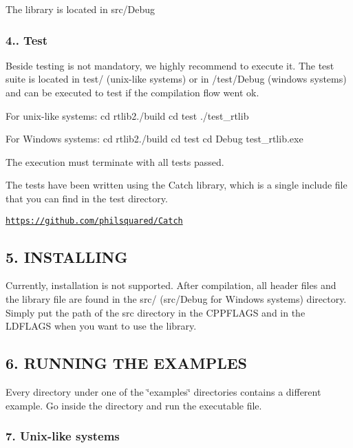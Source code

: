 The library is located in src/\+Debug

\subsubsection*{4.. Test}

Beside testing is not mandatory, we highly recommend to execute it. The test suite is located in test/ (unix-\/like systems) or in /test/\+Debug (windows systems) and can be executed to test if the compilation flow went ok.


\begin{DoxyItemize}
\item For unix-\/like systems\+: cd rtlib2./build cd test ./test\+\_\+rtlib
\item For Windows systems\+: cd rtlib2./build cd test cd Debug test\+\_\+rtlib.\+exe
\end{DoxyItemize}

The execution must terminate with all tests passed.

The tests have been written using the Catch library, which is a single include file that you can find in the test directory.

\href{https://github.com/philsquared/Catch}{\tt https\+://github.\+com/philsquared/\+Catch}

\subsection*{5. I\+N\+S\+T\+A\+L\+L\+I\+NG}

Currently, installation is not supported. After compilation, all header files and the library file are found in the src/ (src/\+Debug for Windows systems) directory. Simply put the path of the src directory in the C\+P\+P\+F\+L\+A\+GS and in the L\+D\+F\+L\+A\+GS when you want to use the library.

\subsection*{6. R\+U\+N\+N\+I\+NG T\+HE E\+X\+A\+M\+P\+L\+ES}

Every directory under one of the \char`\"{}examples\char`\"{} directories contains a different example. Go inside the directory and run the executable file.

\subsubsection*{7. Unix-\/like systems}

